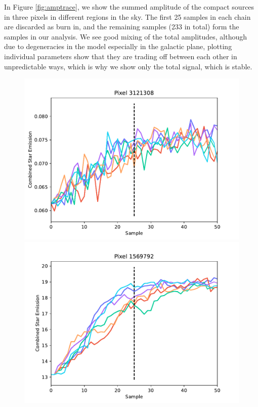 \documentclass{aa}
\begin{document}
In Figure \ref{fig:amptrace}, we show the summed amplitude of the compact sources in three pixels in different regions in the sky. The first 25 samples in each chain are discarded as burn in, and the remaining samples (233 in total) form the samples in our analysis. We see good mixing of the total amplitudes, although due to degeneracies in the model especially in the galactic plane, plotting individual parameters show that they are trading off between each other in unpredictable ways, which is why we show only the total signal, which is stable.

\begin{figure}
  \centering
  \includegraphics[width=\columnwidth]{figs/mixing/total_star_trace_3121308.pdf} \\
  \includegraphics[width=\columnwidth]{figs/mixing/total_star_trace_1569792.pdf} \\

\end{figure}
\end{document}
